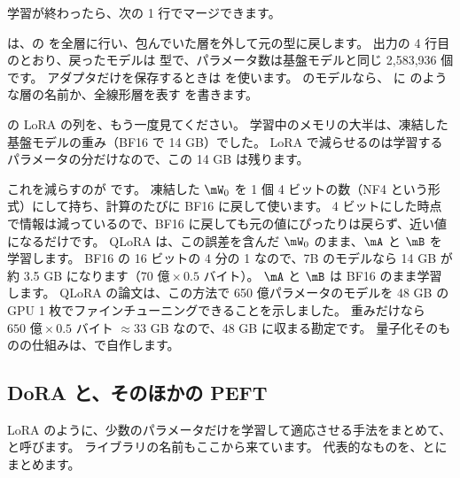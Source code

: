 学習が終わったら、次の 1 行でマージできます。


 は、の  を全層に行い、包んでいた層を外して元の型に戻します。
出力の 4 行目のとおり、戻ったモデルは  型で、パラメータ数は基盤モデルと同じ 2,583,936 個です。
アダプタだけを保存するときは  を使います。
 のモデルなら、 に  のような層の名前か、全線形層を表す  を書きます。

の LoRA の列を、もう一度見てください。
学習中のメモリの大半は、凍結した基盤モデルの重み（BF16 で 14 GB）でした。
LoRA で減らせるのは学習するパラメータの分だけなので、この 14 GB は残ります。

これを減らすのが です\cite{dettmers2023qlora}。
凍結した $\mW_0$ を 1 個 4 ビットの数（NF4 という形式）にして持ち、計算のたびに BF16 に戻して使います。
4 ビットにした時点で情報は減っているので、BF16 に戻しても元の値にぴったりは戻らず、近い値になるだけです。
QLoRA は、この誤差を含んだ $\mW_0$ のまま、$\mA$ と $\mB$ を学習します。
BF16 の 16 ビットの 4 分の 1 なので、7B のモデルなら 14 GB が約 3.5 GB になります（$70\text{ 億}\times0.5$ バイト）。
$\mA$ と $\mB$ は BF16 のまま学習します。
QLoRA の論文は、この方法で 650 億パラメータのモデルを 48 GB の GPU 1 枚でファインチューニングできることを示しました\cite{dettmers2023qlora}。
重みだけなら $650\text{ 億}\times0.5$ バイト $\approx33$ GB なので、48 GB に収まる勘定です。
量子化そのものの仕組みは、で自作します。

\subsection{DoRA と、そのほかの PEFT}\label{sec:lora-peft-family}

LoRA のように、少数のパラメータだけを学習して適応させる手法をまとめて、
と呼びます。
 ライブラリの名前もここから来ています。
代表的なものを、とにまとめます。

